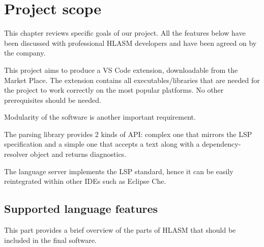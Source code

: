 \chapter{Project scope}

This chapter reviews specific goals of our project.
All the features below have been discussed with professional HLASM developers and have been agreed on by the company.

This project aims to produce a VS Code extension, downloadable from the Market Place. The extension contains all executables/libraries that are needed for the project to work correctly on the most popular platforms. No other prerequisites should be needed.

Modularity of the software is another important requirement. 

The parsing library provides 2 kinds of API: complex one that mirrors the LSP specification and a simple one that accepts a text along with a dependency-resolver object and returns diagnostics. 

The language server implements the LSP standard, hence it can be easily reintegrated within other IDEs such as Eclipse Che.

\section{Supported language features}
This part provides a brief overview of the parts of HLASM that should be included in the final software.

